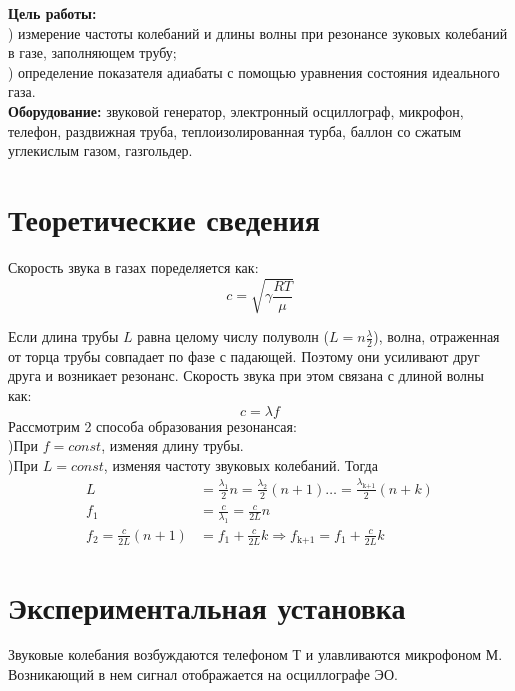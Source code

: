 \textbf{Цель работы:} \\) измерение частоты колебаний и длины волны при резонансе 
зуковых колебаний в газе, заполняющем трубу;\\) определение показателя адиабаты с помощью уравнения состояния
идеального газа.\\ \indent
\textbf{Оборудование:} звуковой генератор, электронный осциллограф, 
микрофон, телефон, раздвижная труба, теплоизолированная турба, 
баллон со сжатым углекислым газом, газгольдер.\\ 

\section*{Теоретические сведения}

Скорость звука в газах поределяется как:
\begin{equation}
    c = \sqrt{\gamma \frac{R T}{\mu}}
\end{equation}

Если длина трубы $L$ равна целому числу полуволн ($L = n\frac{\lambda}{2}$),
волна, отраженная от торца трубы совпадает по фазе с падающей. Поэтому 
они усиливают друг друга и возникает резонанс. Скорость звука при 
этом связана с длиной волны как: 
\begin{equation}
   c = \lambda f
\end{equation}
\indent
Рассмотрим 2 способа образования резонансая:\\)При $f = const$, изменяя длину трубы.\\)При $L = const$, изменяя частоту звуковых колебаний. Тогда
\begin{align}
    L &= \frac{\lambda_1}{2} n = \frac{\lambda_2}{2} (n+1)\dots = \frac{\lambda_{\text{k+1}}}{2}(n + k)\\
    f_1 &= \frac{c}{\lambda_1} = \frac{c}{2L} n\\
    f_2 = \frac{c}{2L}(n + 1) &= f_1 + \frac{c}{2L} k \Rightarrow f_{\text{k+1}} = f_1 + \frac{c}{2L} k
\end{align}

\section*{Экспериментальная установка}
Звуковые колебания возбуждаются телефоном Т и улавливаются микрофоном М. 
Возникающий в нем сигнал отображается на осциллографе ЭО. 

